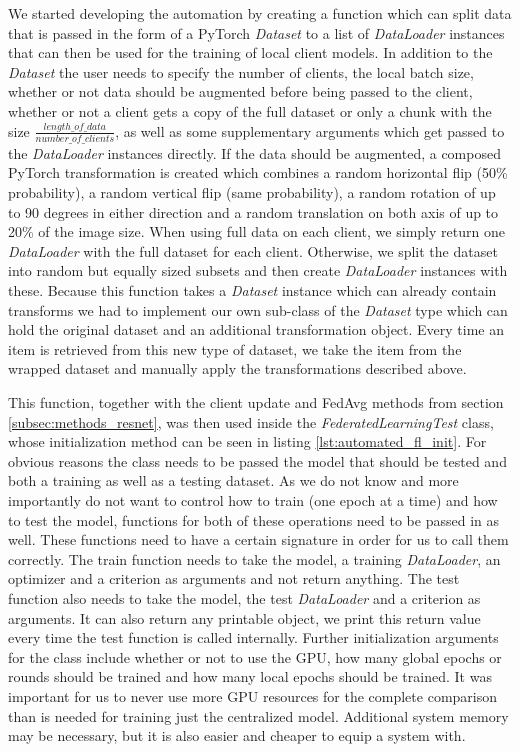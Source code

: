 We started developing the automation by creating a function which can split data that is passed in the form of a PyTorch \textit{Dataset} to a list of \textit{DataLoader} instances that can then be used for the training of local client models. In addition to the \textit{Dataset} the user needs to specify the number of clients, the local batch size, whether or not data should be augmented before being passed to the client, whether or not a client gets a copy of the full dataset or only a chunk with the size $\frac{length\_of\_data}{number\_of\_clients}$, as well as some supplementary arguments which get passed to the \textit{DataLoader} instances directly.
If the data should be augmented, a composed PyTorch transformation is created which combines a random horizontal flip (50\% probability), a random vertical flip (same probability), a random rotation of up to 90 degrees in either direction and a random translation on both axis of up to 20\% of the image size.
When using full data on each client, we simply return one \textit{DataLoader} with the full dataset for each client. Otherwise, we split the dataset into random but equally sized subsets and then create \textit{DataLoader} instances with these. 
Because this function takes a \textit{Dataset} instance which can already contain transforms we had to implement our own sub-class of the \textit{Dataset} type which can hold the original dataset and an additional transformation object. Every time an item is retrieved from this new type of dataset, we take the item from the wrapped dataset and manually apply the transformations described above.

This function, together with the client update and FedAvg methods from section \ref{subsec:methods_resnet}, was then used inside the \textit{FederatedLearningTest} class, whose initialization method can be seen in listing \ref{lst:automated_fl_init}. For obvious reasons the class needs to be passed the model that should be tested and both a training as well as a testing dataset. As we do not know and more importantly do not want to control how to train (one epoch at a time) and how to test the model, functions for both of these operations need to be passed in as well. These functions need to have a certain signature in order for us to call them correctly. The train function needs to take the model, a training \textit{DataLoader}, an optimizer and a criterion as arguments and not return anything. The test function also needs to take the model, the test \textit{DataLoader} and a criterion as arguments. It can also return any printable object, we print this return value every time the test function is called internally.
Further initialization arguments for the class include whether or not to use the GPU, how many global epochs or rounds should be trained and how many local epochs should be trained. It was important for us to never use more GPU resources for the complete comparison than is needed for training just the centralized model. Additional system memory may be necessary, but it is also easier and cheaper to equip a system with.

